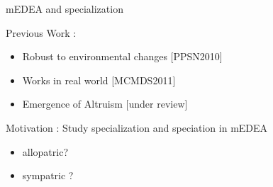 \documentclass[8pt,handout,notes=show]{beamer}
\begin{document}
\begin{frame}{mEDEA and specialization}

Previous Work :
	\begin{itemize}
		\item Robust to environmental changes [PPSN2010] \nocite{bredeche11mcmds} 
		\item Works in real world [MCMDS2011] %
		\item Emergence of Altruism [under review]
	\end{itemize}

\vfill

Motivation : Study specialization and speciation in mEDEA
\begin{itemize}
	\item allopatric?
	\item sympatric ?
\end{itemize}


% 
% 
% 






\end{frame}
\end{document}
